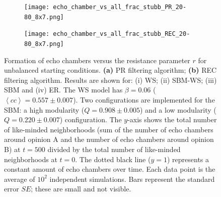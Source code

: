 \documentclass[11 pt , letterpaper , twoside , openright]{book}
\begin{document}
\begin{figure}[H]
  \begin{subfigure}[b]{0.49\textwidth}
    \caption{}
  	\texttt{[image: echo\_chamber\_vs\_all\_frac\_stubb\_PR\_20-80\_8x7.png]}
    \label{PR_all_frac_stubb_20-80}
  \end{subfigure}
  \begin{subfigure}[b]{0.49\textwidth}
    \caption{}
  	\texttt{[image: echo\_chamber\_vs\_all\_frac\_stubb\_REC\_20-80\_8x7.png]}
    \label{REC_all_frac_stubb_20-80}
  \end{subfigure}
  \captionsetup{format=plain}
  \caption[Formation of echo chambers versus the resistance parameter of the actors, $r$, for unbalanced starting conditions. The PR and REC filtering algorithms are used.]{Formation of echo chambers versus the resistance parameter $r$ for unbalanced starting conditions. \textbf{(a)} PR filtering algorithm; \textbf{(b)} REC filtering algorithm. Results are shown for: (i) WS; (ii) SBM-WS; (iii) SBM and (iv) ER. The WS model has $\beta = 0.06$ ($\left<cc\right> = 0.557 \pm 0.007$). Two configurations are implemented for the SBM: a high modularity ($Q = 0.908 \pm 0.005$) and a low modularity ($Q = 0.220 \pm 0.007$) configuration. The $y$-axis shows the total number of like-minded neighborhoods (sum of the number of echo chambers around opinion A and the number of echo chambers around opinion B) at $t=500$ divided by the total number of like-minded neighborhoods at $t=0$. The dotted black line ($y=1$) represents a constant amount of echo chambers over time. Each data point is the average of $10^2$ independent simulations. Bars represent the standard error $SE$; these are small and not visible.}
\label{echo_vs_all_frac_stubb_PR-REC_20-80}
\end{figure}
\noindent
\end{document}
